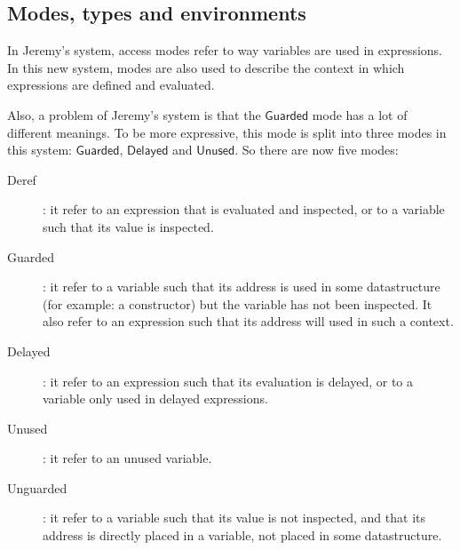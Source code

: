 \documentclass{article}
\newcommand{\Guarded}{\mathsf{Guarded}}
\newcommand{\Delayed}{\mathsf{Delayed}}
\newcommand{\Unused}{\mathsf{Unused}}
\begin{document}
\subsection{Modes, types and environments}
In Jeremy's system, access modes refer to way variables are used in expressions.
In this new system, modes are also used to describe the context in which
expressions are defined and evaluated.

Also, a problem of Jeremy's system is that the $\Guarded$ mode has a lot of
different meanings. To be more expressive, this mode is split into three modes
in this system: $\Guarded$, $\Delayed$ and $\Unused$. So there are now five
modes:

\begin{description}
  \item[Deref]: it refer to an expression that is evaluated and inspected, or to
    a variable such that its value is inspected.
  \item[Guarded]: it refer to a variable such that its address is used in some
    datastructure (for example: a constructor) but the variable has not been
    inspected. It also refer to an expression such that its address will used
    in such a context.
  \item[Delayed]: it refer to an expression such that its evaluation is delayed,
    or to a variable only used in delayed expressions.
  \item[Unused]: it refer to an unused variable.
  \item[Unguarded]: it refer to a variable such that its value is not inspected,
    and that its address is directly placed in a variable, not placed in some
    datastructure.
\end{description}
\end{document}
